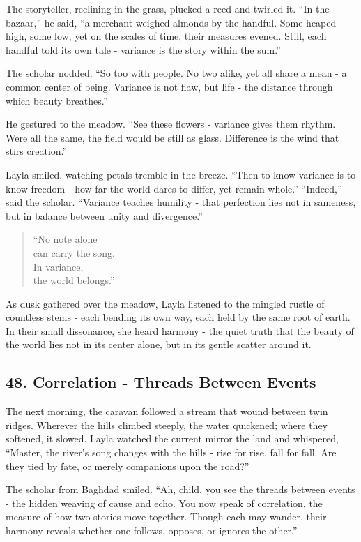 \documentclass[
  letterpaper,
  DIV=11,
  numbers=noendperiod]{scrreprt}
\begin{document}
The storyteller, reclining in the grass, plucked a reed and twirled it.
``In the bazaar,'' he said, ``a merchant weighed almonds by the handful.
Some heaped high, some low, yet on the scales of time, their measures
evened. Still, each handful told its own tale - variance is the story
within the sum.''

The scholar nodded. ``So too with people. No two alike, yet all share a
mean - a common center of being. Variance is not flaw, but life - the
distance through which beauty breathes.''

He gestured to the meadow. ``See these flowers - variance gives them
rhythm. Were all the same, the field would be still as glass. Difference
is the wind that stirs creation.''

Layla smiled, watching petals tremble in the breeze. ``Then to know
variance is to know freedom - how far the world dares to differ, yet
remain whole.'' ``Indeed,'' said the scholar. ``Variance teaches
humility - that perfection lies not in sameness, but in balance between
unity and divergence.''

\begin{quote}
``No note alone\\
can carry the song.\\
In variance,\\
the world belongs.''
\end{quote}

As dusk gathered over the meadow, Layla listened to the mingled rustle
of countless stems - each bending its own way, each held by the same
root of earth. In their small dissonance, she heard harmony - the quiet
truth that the beauty of the world lies not in its center alone, but in
its gentle scatter around it.

\subsection{48. Correlation - Threads Between
Events}\label{correlation---threads-between-events}

The next morning, the caravan followed a stream that wound between twin
ridges. Wherever the hills climbed steeply, the water quickened; where
they softened, it slowed. Layla watched the current mirror the land and
whispered, ``Master, the river's song changes with the hills - rise for
rise, fall for fall. Are they tied by fate, or merely companions upon
the road?''

The scholar from Baghdad smiled. ``Ah, child, you see the threads
between events - the hidden weaving of cause and echo. You now speak of
correlation, the measure of how two stories move together. Though each
may wander, their harmony reveals whether one follows, opposes, or
ignores the other.''
\end{document}
